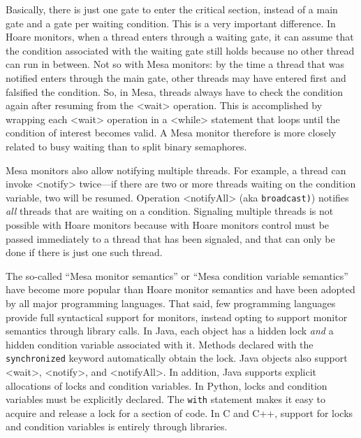 \documentclass{report}
\begin{document}
Basically, there is just one gate to enter the critical section, instead
of a main gate and a gate per waiting condition.
This is a very important difference.  In Hoare monitors, when a thread
enters through a waiting gate, it can assume that the condition associated
with the waiting gate still holds because no other thread can run in between.
Not so with Mesa monitors: by the time a thread that was notified enters
through the main gate, other threads may have entered first and falsified
the condition.  So, in Mesa, threads always have to check the condition
again after resuming from the <{wait}> operation.  This is accomplished
by wrapping each <{wait}> operation in a <{while}> statement that
loops until the condition of interest becomes valid.
A Mesa monitor therefore is more closely related to busy waiting
than to split binary semaphores.

Mesa monitors also allow notifying multiple threads.
For example, a thread can invoke <{notify}> twice---if there are
two or more threads waiting on the condition variable, two will be resumed.
Operation <{notifyAll}>
%
(aka \texttt{broadcast)})
%
notifies \emph{all} threads that are waiting
on a condition.
Signaling multiple threads is not possible with Hoare monitors because with
Hoare monitors control
must be passed immediately to a thread that has been signaled, and that
can only be done if there is just one such thread.

The so-called
``Mesa monitor semantics'' or ``Mesa condition variable semantics''
have become more popular than Hoare monitor semantics and have been
adopted by all major programming languages.
That said, few programming languages provide full syntactical support
for monitors, instead opting to support monitor semantics through library
calls.
In Java, each object has a hidden lock \emph{and} a hidden condition variable
associated with it.
Methods declared with the \texttt{synchronized} keyword automatically
obtain the lock.  Java objects also support <{wait}>, <{notify}>,
and <{notifyAll}>.
In addition, Java supports explicit allocations of locks
and condition variables.
In Python, locks and condition variables must be explicitly declared.
The \texttt{with} statement makes it easy to acquire and release a lock
for a section of code.
In C and C++, support for locks and condition variables is entirely
through libraries.

\end{document}
